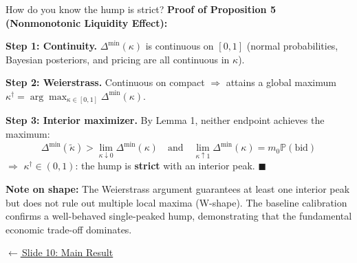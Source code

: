 \documentclass[aspectratio=169,10pt]{beamer}
\newcommand{\PP}{\mathbb{P}}
\newcommand{\1}{\mathbf{1}}
\newcommand{\returnlink}[2]{%
  \par\vspace{0.2em}\hfill{\scriptsize\hyperlink{#1}{\textcolor{brightblue}{$\leftarrow$\,#2}}}%
}
\begin{document}
\begin{frame}{How do you know the hump is strict?}
\hypertarget{backup:nonmonotonicity_proof}{}
\small
\textbf{Proof of Proposition 5 (Nonmonotonic Liquidity Effect):}

\vspace{0.3em}

\textbf{Step 1: Continuity.} $\Delta^{\min}(\kappa)$ is continuous on $[0,1]$ (normal probabilities, Bayesian posteriors, and pricing are all continuous in $\kappa$).

\vspace{0.3em}

\textbf{Step 2: Weierstrass.} Continuous on compact $\Rightarrow$ attains a global maximum $\kappa^{\dagger} = \arg\max_{\kappa \in [0,1]} \Delta^{\min}(\kappa)$.

\vspace{0.3em}

\textbf{Step 3: Interior maximizer.} By Lemma 1, neither endpoint achieves the maximum:
\[
\Delta^{\min}(\tilde{\kappa}) > \lim_{\kappa \downarrow 0} \Delta^{\min}(\kappa) \quad \text{and} \quad \lim_{\kappa \uparrow 1} \Delta^{\min}(\kappa) = m_0 \PP(\text{bid})
\]
$\Rightarrow$ $\kappa^{\dagger} \in (0,1)$: the hump is \textbf{strict} with an interior peak. $\blacksquare$

\vspace{0.3em}

{\footnotesize\textbf{Note on shape:} The Weierstrass argument guarantees at least one interior peak but does not rule out multiple local maxima (W-shape). The baseline calibration confirms a well-behaved single-peaked hump, demonstrating that the fundamental economic trade-off dominates.}

\returnlink{main:result}{Slide 10: Main Result}
\end{frame}
\end{document}
